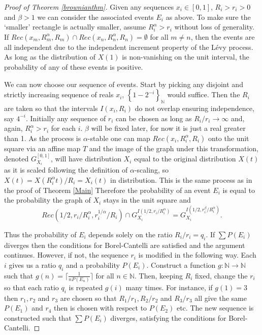 \begin{proof}[Proof of Theorem \ref{brownianthm}]
Given any sequences $x_i \in [0,1]$, $R_i > r_i > 0$ and $\beta > 1$ we can consider the associated events $E_i$ as above. To make sure the `smaller' rectangle is actually smaller, assume $R_i^{\alpha} > r_i$ without loss of generality. If $Rec(x_m,R_m^{\alpha}, R_m) \cap Rec(x_n,R_n^{\alpha},R_n) = \emptyset$ for all $m\neq n$, then the events are all independent due to the independent increment property of the L\'evy process. As long as the distribution of $X(1)$ is non-vanishing on the unit interval, the probability of any of these events is positive.

We can now choose our sequence of events. Start by picking any disjoint and strictly increasing sequence of reals  $x_i$, $\left\{1-2^{-i} \right\}_{\mathbb{N}}$ would suffice. Then the $R_i$ are taken so that the intervals $I(x_i, R_i)$ do not overlap ensuring independence, say $4^{-i}$. Initially any sequence of $r_i$ can be chosen as long as $R_i/r_i \rightarrow \infty$ and, again, $R_i^{\alpha} > r_i$ for each $i$. $\beta$ will be fixed later, for now it is just a real greater than 1. As the process is $\alpha$-stable one can map $Rec(x_i,R_i^{\alpha},R_i)$ onto the unit square via an affine map $T$ and the image of the graph under this transformation, denoted $G_{X_i}^{[0,1]}$, will have distribution $X_i$ equal to the original distribution $X(t)$ as it is scaled following the definition of $\alpha$-scaling, so $X(t) = X(R_i^\alpha t)/R_i = X_i(t)$ in distribution. This is the same process as in the proof of Theorem \ref{Main} Therefore the probability of an event $E_i$ is equal to the probability the graph of $X_i$ stays in the unit square and 
$$Rec(1/2,r_i/R_i^{\alpha} ,r_i^{1/\alpha}/R_i ) \cap G_{X_i}^{I(1/2, r_i/R_i^{\alpha})} = G_{X_i}^{I(1/2, r_i^{\beta}/R_i^{\alpha})}.$$

Thus the probability of $E_i$ depends solely on the ratio $R_i/r_i = q_i$. If $\sum P(E_i)$ diverges then the conditions for Borel-Cantelli are satisfied and the argument continues. However, if not, the sequence $r_i$ is modified in the following way. Each $i$ gives us a ratio $q_i$ and a probability $P(E_i)$. Construct a function $g \colon \mathbb{N} \rightarrow \mathbb{N}$ such that $g(n) = \lceil \frac{1}{nP(E_n)}\rceil$ for all $n\in \mathbb{N}$. Then, keeping $R_i$ fixed, change the $r_i$ so that each ratio $q_i$ is repeated $g(i)$ many times. For instance, if $g(1) = 3$ then $r_1,r_2$ and $r_3$ are chosen so that $R_1/r_1, R_2/r_2$ and $R_3/r_3$ all give the same $P(E_1)$ and $r_4$ then is chosen with respect to $P(E_2)$ etc. The new sequence is constructed such that $\sum P(E_i)$ diverges, satisfying the conditions for Borel-Cantelli.


\end{proof}
